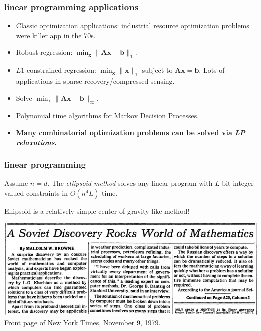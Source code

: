 \documentclass[compress]{beamer}
\newcommand{\bv}[1]{\mathbf{#1}}
\begin{document}
\begin{frame}
		\frametitle{linear programming applications}
	\begin{itemize}
		\item Classic optimization applications: industrial resource optimization problems were killer app in the 70s.
		\item Robust regression: $\min_{\bv{x}} \|\bv{A} \bv{x} - \bv{b}\|_1$. 
		\item $L1$ constrained regression: $\min_{\bv{x}} \|\bv{x}\|_1$ subject to $\bv{A}\bv{x} = \bv{b}$. Lots of applications in sparse recovery/compressed sensing.
		\item Solve $\min_{\bv{x}}\|\bv{A} \bv{x} - \bv{b}\|_{\infty}$.   
		\item Polynomial time algorithms for Markov Decision Processes. 
		\item \alert{\textbf{Many combinatorial optimization problems can be solved via \emph{LP relaxations}.}}
	\end{itemize}
\end{frame}

\begin{frame}[t]
	\frametitle{linear programming}
	\begin{theorem}[Khachiyan, 1979]
	Assume $n=d$. The \emph{ellipsoid method} solves any linear program with $L$-bit integer valued constraints in $O(n^4L)$ time. 
	\end{theorem}
Ellipsoid is a relatively simple center-of-gravity like method!
	\begin{center}
		\includegraphics[width=\textwidth]{ellipsoidnews.png}
		Front page of New York Times, November 9, 1979.
	\end{center}
\end{frame}
\end{document}

